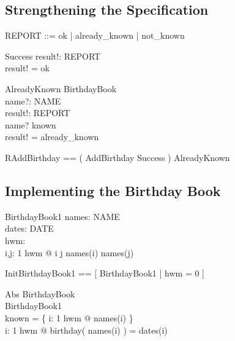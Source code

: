 \subsection{Strengthening the Specification}


\begin{zed}
  REPORT ::= ok | already\_known | not\_known
\end{zed}

\begin{schema}{Success}
  result!: REPORT \\
  \where
  result! = ok
\end{schema}

\begin{schema}{AlreadyKnown}
  \Xi BirthdayBook \\
  name?: NAME \\
  result!: REPORT \\
  \where
  name? \in known \\
  result! = already\_known \\
\end{schema}

\begin{zed}
  RAddBirthday == ( AddBirthday \land Success ) \lor AlreadyKnown
\end{zed}


\subsection{Implementing the Birthday Book}


\begin{schema}{BirthdayBook1}
  names: \nat \fun NAME \\
  dates: \nat \fun DATE \\
  hwm:   \nat \\
  \where
  \forall i,j: 1 \upto hwm @ i \neq j \implies names(i) \neq names(j) \\
\end{schema}

\begin{zed}
 InitBirthdayBook1 == [ BirthdayBook1 | hwm = 0 ] 
\end{zed}

\begin{schema}{Abs}
  BirthdayBook \\
  BirthdayBook1 \\
  \where
  known = \{ i: 1 \upto hwm @ names(i) \} \\
  \forall i: 1 \upto hwm @ birthday( names(i) ) = dates(i)
\end{schema}

